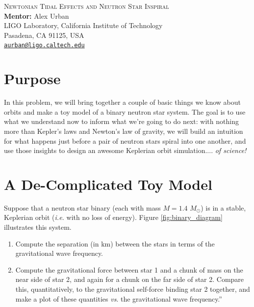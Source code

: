 \documentclass[11pt]{article}
\begin{document}
\begin{center}
{\Large\textsc{Newtonian Tidal Effects and Neutron Star Inspiral}} \\
\vspace{10pt}
{\large \textbf{Mentor:} Alex Urban} \\
{\small LIGO Laboratory, California Institute of Technology \\
Pasadena, CA 91125, USA \\
\href{mailto:aurban@ligo.caltech.edu}{\texttt{aurban@ligo.caltech.edu}}}
\end{center}

\section*{Purpose}

\hspace{15pt} In this problem, we will bring together a couple of basic things we know about orbits and make a toy model of a binary neutron star system. The goal is to use what we understand now to inform what we're going to do next: with nothing more than Kepler's laws and Newton's law of gravity, we will build an intuition for what happens just before a pair of neutron stars spiral into one another, and use those insights to design an awesome Keplerian orbit simulation.... \textit{of science!}

\section*{A De-Complicated Toy Model}
\hspace{15pt} Suppose that a neutron star binary (each with mass $M = 1.4\,\, M_{\odot}$) is in a stable, Keplerian orbit (\textit{i.e.} with no loss of energy). Figure \ref{fig:binary_diagram} illustrates this system.

\begin{enumerate}
\item Compute the separation (in km) between the stars in terms of the gravitational wave frequency.

\item Compute the gravitational force between star 1 and a chunk of mass on the near side of star 2, and again for a chunk on the far side of star 2. Compare this, quantitatively, to the gravitational self-force binding star 2 together, and make a plot of these quantities \textit{vs}. the gravitational wave frequency.”
\end{enumerate}
\end{document}
